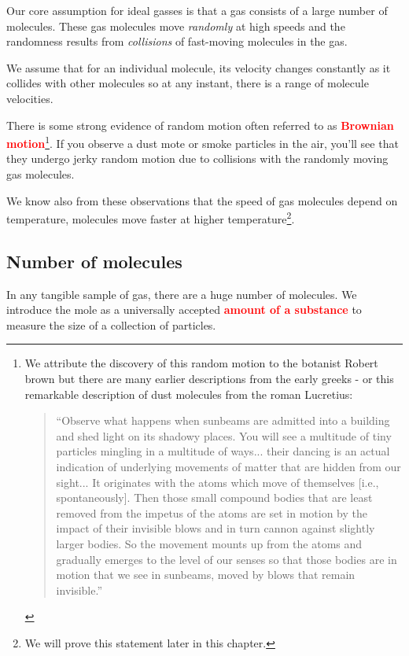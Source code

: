 \documentclass[a4paper,12pt]{book}
\newcommand{\keypoint}[1]{\textbf{\textcolor{red}{#1}}}
\newcommand{\keypoint}[1]{\textbf{\textcolor{red}{#1}}}
\begin{document}
Our core assumption for ideal gasses is that a gas consists of a large number of molecules. These gas molecules move \emph{randomly} at high speeds and the  randomness results from \emph{collisions} of fast-moving molecules in the gas.

We assume that for an individual molecule, its velocity changes constantly as it collides with other molecules so at any instant, there is a range of molecule velocities.  

There is some strong evidence of random motion often referred to as \keypoint{Brownian motion}\footnote{We attribute the discovery of this random motion to the botanist Robert brown but there are many earlier descriptions from the early greeks - or this remarkable description of dust molecules from the roman Lucretius: \begin{quote}
    
``Observe what happens when sunbeams are admitted into a building and shed light on its shadowy places. You will see a multitude of tiny particles mingling in a multitude of ways... their dancing is an actual indication of underlying movements of matter that are hidden from our sight... It originates with the atoms which move of themselves [i.e., spontaneously]. Then those small compound bodies that are least removed from the impetus of the atoms are set in motion by the impact of their invisible blows and in turn cannon against slightly larger bodies. So the movement mounts up from the atoms and gradually emerges to the level of our senses so that those bodies are in motion that we see in sunbeams, moved by blows that remain invisible.''\end{quote}}. If you observe a dust mote or smoke particles in the air, you'll see that they undergo jerky random motion due to collisions with the randomly moving gas molecules. 

We know also from these observations that the speed of gas molecules depend on temperature, molecules move faster at higher temperature\footnote{We will prove this statement later in this chapter.}.

\subsection{Number of molecules}

In any tangible sample of gas, there are a huge number of molecules. We introduce the mole as a universally accepted \keypoint{amount of a substance} to measure the size of a collection of particles.
\end{document}
